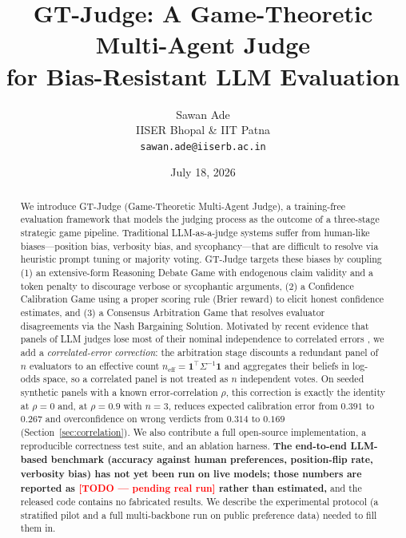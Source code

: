\documentclass[11pt]{article}
\title{GT-Judge: A Game-Theoretic Multi-Agent Judge\\ for Bias-Resistant LLM Evaluation}
\author{Sawan Ade\\ IISER Bhopal \& IIT Patna\\ \texttt{sawan.ade@iiserb.ac.in}}
\date{July 18, 2026}
\newcommand{\neff}{n_{\mathrm{eff}}}
\newcommand{\todo}[1]{\textcolor{red}{\textbf{[TODO --- #1]}}}
\begin{document}
\maketitle

\begin{abstract}
We introduce GT-Judge (Game-Theoretic Multi-Agent Judge), a training-free
evaluation framework that models the judging process as the outcome of a
three-stage strategic game pipeline. Traditional LLM-as-a-judge systems suffer
from human-like biases---position bias, verbosity bias, and sycophancy---that
are difficult to resolve via heuristic prompt tuning or majority voting.
GT-Judge targets these biases by coupling (1) an extensive-form Reasoning
Debate Game with endogenous claim validity and a token penalty to discourage
verbose or sycophantic arguments, (2) a Confidence Calibration Game using a
proper scoring rule (Brier reward) to elicit honest confidence estimates, and
(3) a Consensus Arbitration Game that resolves evaluator disagreements via the
Nash Bargaining Solution. Motivated by recent evidence that panels of LLM
judges lose most of their nominal independence to correlated errors
\citep{kohli2026}, we add a \emph{correlated-error correction}: the arbitration
stage discounts a redundant panel of $n$ evaluators to an effective count
$\neff = \mathbf{1}^\top \Sigma^{-1}\mathbf{1}$ and aggregates their beliefs in
log-odds space, so a correlated panel is not treated as $n$ independent votes.
On seeded synthetic panels with a known error-correlation $\rho$, this
correction is exactly the identity at $\rho=0$ and, at $\rho=0.9$ with $n=3$,
reduces expected calibration error from $0.391$ to $0.267$ and overconfidence
on wrong verdicts from $0.314$ to $0.169$ (Section~\ref{sec:correlation}).
We also contribute a full open-source implementation, a reproducible
correctness test suite, and an ablation harness. \textbf{The end-to-end
LLM-based benchmark (accuracy against human preferences, position-flip rate,
verbosity bias) has not yet been run on live models; those numbers are reported
as \todo{pending real run} rather than estimated,} and the released code
contains no fabricated results. We describe the experimental protocol
(a stratified pilot and a full multi-backbone run on public preference data)
needed to fill them in.
\end{abstract}
\end{document}

